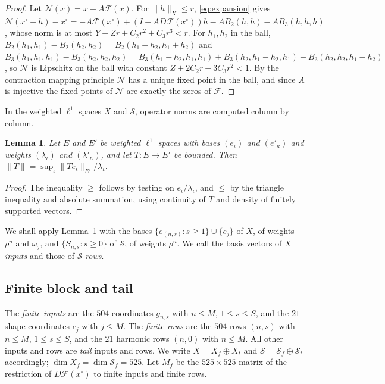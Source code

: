 \documentclass[11pt]{amsart}
\newtheorem{lemma}[theorem]{Lemma}
\theoremstyle{definition}
\theoremstyle{remark}
\numberwithin{equation}{section}
\newcommand{\Sc}{\mathcal{S}}
\newcommand{\Fc}{\mathcal{F}}
\newcommand{\Nc}{\mathcal{N}}
\newcommand{\nrm}[1]{\lVert #1\rVert}
\begin{document}
\begin{proof}
Let $\Nc(x)=x-A\Fc(x)$. For $\nrm h_X\leq r$, \eqref{eq:expansion} gives $\Nc(x^\circ+h)-x^\circ=-A\Fc(x^\circ)+(I-AD\Fc(x^\circ))h-AB_2(h,h)-AB_3(h,h,h)$, whose norm is at most $Y+Zr+C_2r^2+C_3r^3<r$. For $h_1,h_2$ in the ball, $B_2(h_1,h_1)-B_2(h_2,h_2)=B_2(h_1-h_2,h_1+h_2)$ and $B_3(h_1,h_1,h_1)-B_3(h_2,h_2,h_2)=B_3(h_1-h_2,h_1,h_1)+B_3(h_2,h_1-h_2,h_1)+B_3(h_2,h_2,h_1-h_2)$, so $\Nc$ is Lipschitz on the ball with constant $Z+2C_2r+3C_3r^2<1$. By the contraction mapping principle $\Nc$ has a unique fixed point in the ball, and since $A$ is injective the fixed points of $\Nc$ are exactly the zeros of $\Fc$.
\end{proof}

In the weighted $\ell^1$ spaces $X$ and $\Sc$, operator norms are computed column by column.

\begin{lemma}\label{lem:columns}
Let $E$ and $E'$ be weighted $\ell^1$ spaces with bases $(e_\iota)$ and $(e'_\kappa)$ and weights $(\lambda_\iota)$ and $(\lambda'_\kappa)$, and let $T\colon E\to E'$ be bounded. Then $\nrm T=\sup_\iota\nrm{Te_\iota}_{E'}/\lambda_\iota$.
\end{lemma}

\begin{proof}
The inequality $\geq$ follows by testing on $e_\iota/\lambda_\iota$, and $\leq$ by the triangle inequality and absolute summation, using continuity of $T$ and density of finitely supported vectors.
\end{proof}

We shall apply Lemma~\ref{lem:columns} with the bases $\{e_{(n,s)}:s\geq1\}\cup\{e_j\}$ of $X$, of weights $\rho^n$ and $\omega_j$, and $\{S_{n,s}:s\geq0\}$ of $\Sc$, of weights $\rho^n$. We call the basis vectors of $X$ \emph{inputs} and those of $\Sc$ \emph{rows}.

\subsection{Finite block and tail}
The \emph{finite inputs} are the $504$ coordinates $g_{n,s}$ with $n\leq M$, $1\leq s\leq S$, and the $21$ shape coordinates $c_j$ with $j\leq M$. The \emph{finite rows} are the $504$ rows $(n,s)$ with $n\leq M$, $1\leq s\leq S$, and the $21$ harmonic rows $(n,0)$ with $n\leq M$. All other inputs and rows are \emph{tail} inputs and rows. We write $X=X_f\oplus X_t$ and $\Sc=\Sc_f\oplus\Sc_t$ accordingly; $\dim X_f=\dim\Sc_f=525$. Let $M_f$ be the $525\times525$ matrix of the restriction of $D\Fc(x^\circ)$ to finite inputs and finite rows.
\end{document}
